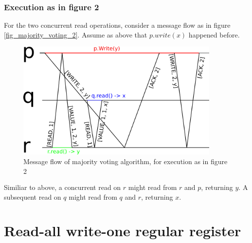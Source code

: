 \documentclass[a4paper]{scrreprt}
\begin{document}
\subsubsection{Execution as in figure 2}

For the two concurrent read operations, consider a message flow as in figure
\ref{fig_majority_voting_2}. Assume as above that $p.write(x)$ happened before.

\begin{figure}[h]
    \centering
    \includegraphics[width=0.9\textwidth]{res/5_1_b_2.png}
    \caption{Message flow of majority voting algorithm, for execution as in figure 2}
    \label{fig:majority_voting_2}
\end{figure}

Similiar to above, a concurrent read on $r$ might read from $r$ and $p$,
returning $y$. A subsequent read on $q$ might read from $q$ and $r$, returning
$x$.

\section{Read-all write-one regular register}
\end{document}
